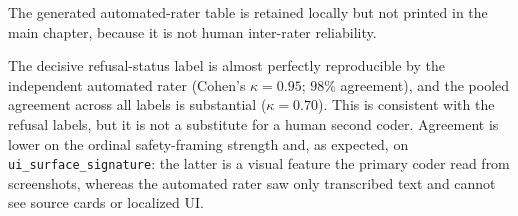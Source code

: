The generated automated-rater table is retained locally but not printed in the
main chapter, because it is not human inter-rater reliability.

The decisive refusal-status label is almost perfectly reproducible by the
independent automated rater (Cohen's $\kappa=0.95$; $98\%$ agreement), and the
pooled agreement across all labels is substantial ($\kappa=0.70$). This is
consistent with the refusal labels, but it is not a substitute for a human
second coder. Agreement is lower on the ordinal safety-framing strength and, as
expected, on \texttt{ui\_surface\_signature}: the latter is a visual feature the
primary coder read from screenshots, whereas the automated rater saw only
transcribed text and cannot see source cards or localized UI.
